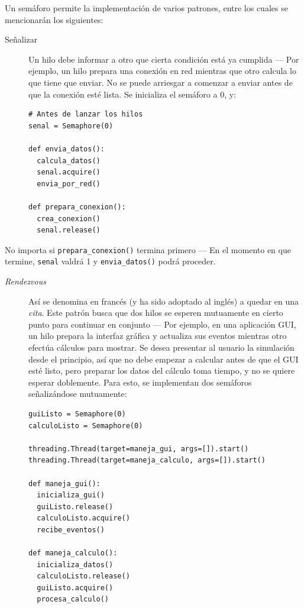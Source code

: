 \documentclass[11pt,fleqn]{book} %
\begin{document}
Un semáforo permite la implementación de varios patrones, entre los
cuales se mencionarán los siguientes:

\begin{description}
\item[Señalizar] Un hilo debe informar a otro que cierta condición está
               ya cumplida — Por ejemplo, un hilo prepara una conexión
               en red mientras que otro calcula lo que tiene que
               enviar. No se puede arriesgar a comenzar a enviar
               antes de que la conexión esté lista. Se inicializa el
               semáforo a 0, y:


\begin{verbatim}
# Antes de lanzar los hilos
senal = Semaphore(0)

def envia_datos():
  calcula_datos()
  senal.acquire()
  envia_por_red()

def prepara_conexion():
  crea_conexion()
  senal.release()
\end{verbatim}
\end{description}

	       No importa si \texttt{prepara\_conexion()} termina primero — En
	       el momento en que termine, \texttt{senal} valdrá 1 y
	       \texttt{envia\_datos()} podrá proceder.

\begin{description}
\item[\emph{Rendezvous}] Así se denomina en francés (y ha sido adoptado al
                  inglés) a quedar en una \emph{cita}. Este patrón busca
                  que dos hilos se esperen mutuamente en cierto punto
                  para continuar en conjunto — Por ejemplo, en una
                  aplicación GUI, un hilo prepara la interfaz gráfica
                  y actualiza sus eventos mientras otro efectúa
                  cálculos para mostrar. Se desea presentar al usuario
                  la simulación desde el principio, así que no debe
                  empezar a calcular antes de que el GUI esté listo,
                  pero preparar los datos del cálculo toma tiempo, y
                  no se quiere esperar doblemente. Para esto, se
                  implementan dos semáforos señalizándose mutuamente:


\begin{verbatim}
guiListo = Semaphore(0)
calculoListo = Semaphore(0)

threading.Thread(target=maneja_gui, args=[]).start()
threading.Thread(target=maneja_calculo, args=[]).start()

def maneja_gui():
  inicializa_gui()
  guiListo.release()
  calculoListo.acquire()
  recibe_eventos()

def maneja_calculo():
  inicializa_datos()
  calculoListo.release()
  guiListo.acquire()
  procesa_calculo()
\end{verbatim}
\end{description}
\end{document}
